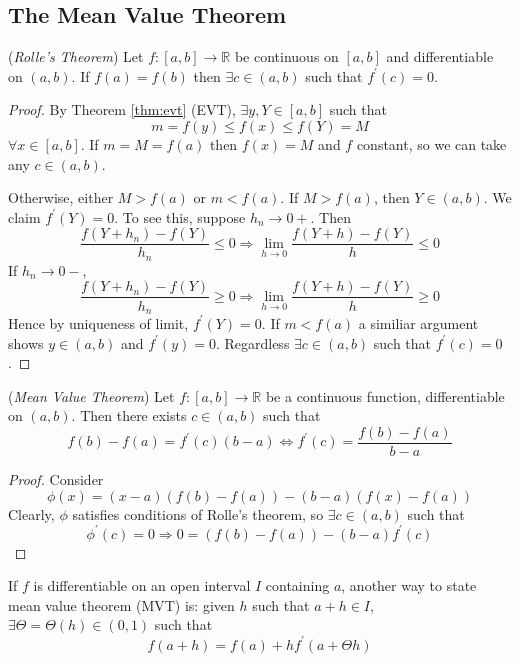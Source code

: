 \documentclass[10pt, a4paper, twoside]{report}
\begin{document}
\subsection{The Mean Value Theorem}
\begin{theorem}
    (\emph{Rolle's Theorem})
    Let \(f:[a,b]\to\mathbb{R}\) be continuous on \([a,b]\) and differentiable on \((a,b)\). If \(f(a)=f(b)\) then \(\exists c\in(a,b)\) such that \(f^\prime(c)=0\).
    \label{thm:rolle}
\end{theorem}
\begin{proof}
    By Theorem \ref{thm:evt} (EVT), \(\exists y,Y\in[a,b]\) such that 
    \[m=f(y)\leq f(x)\leq f(Y)=M\]
    \(\forall x\in[a,b]\). If \(m=M=f(a)\) then \(f(x)=M\) and \(f\) constant, so we can take any \(c\in(a,b)\).

    Otherwise, either \(M>f(a)\) or \(m<f(a)\). If \(M>f(a)\), then \(Y\in(a,b)\). We claim \(f^\prime(Y)=0\). To see this, suppose \(h_n\to 0+\). Then
    \[\frac{f(Y+h_n)-f(Y)}{h_n}\leq 0\Rightarrow\lim_{h\to 0}\frac{f(Y+h)-f(Y)}{h}\leq 0\]
    If \(h_n\to 0-\),
    \[\frac{f(Y+h_n)-f(Y)}{h_n}\geq 0\Rightarrow\lim_{h\to 0}\frac{f(Y+h)-f(Y)}{h}\geq 0\]
    Hence by uniqueness of limit, \(f^\prime(Y)=0\). If \(m<f(a)\) a similiar argument shows \(y\in(a,b)\) and \(f^\prime(y)=0\). Regardless \(\exists c\in(a,b)\) such that \(f^\prime(c)=0\).
\end{proof}
\begin{theorem}
    (\emph{Mean Value Theorem}) Let \(f:[a,b]\to\mathbb{R}\) be a continuous function, differentiable on \((a,b)\). Then there exists \(c\in(a,b)\) such that
    \[f(b)-f(a)=f^\prime(c)(b-a)\Leftrightarrow f^\prime(c)=\frac{f(b)-f(a)}{b-a}\]
    \label{thm:mvt}
\end{theorem}
\begin{proof}
    Consider 
    \[\phi(x)=(x-a)(f(b)-f(a))-(b-a)(f(x)-f(a))\]
    Clearly, \(\phi\) satisfies conditions of Rolle's theorem, so \(\exists c\in(a,b)\) such that 
    \[\phi^\prime(c)=0\Rightarrow 0=(f(b)-f(a))-(b-a)f^\prime(c)\]
\end{proof}
If \(f\) is differentiable on an open interval \(I\) containing \(a\), another way to state mean value theorem (MVT) is: given \(h\) such that \(a+h\in I\), \(\exists \Theta=\Theta(h)\in(0,1)\) such that 
\[f(a+h)=f(a)+hf^\prime(a+\Theta h)\]
\end{document}
